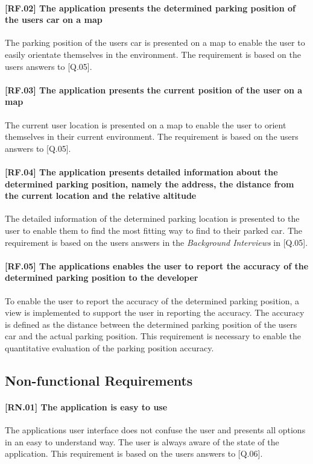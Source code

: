 \paragraph{[RF.02] The application presents the determined parking position of the users car on a map}
The parking position of the users car is presented on a map to enable the user to easily orientate themselves in the environment. The requirement is based on the users answers to [Q.05].

\paragraph{[RF.03] The application presents the current position of the user on a map}
The current user location is presented on a map to enable the user to orient themselves in their current environment. The requirement is based on the users answers to [Q.05].

\paragraph{[RF.04] The application presents detailed information about the determined parking position, namely the address, the distance from the current location and the relative altitude}
The detailed information of the determined parking location is presented to the user to enable them to find the most fitting way to find to their parked car. The requirement is based on the users answers in the \textit{Background Interviews} in [Q.05].

\paragraph{[RF.05] The applications enables the user to report the accuracy of the determined parking position to the developer}
To enable the user to report the accuracy of the determined parking position, a view is implemented to support the user in reporting the accuracy. The accuracy is defined as the distance between the determined parking position of the users car and the actual parking position. This requirement is necessary to enable the quantitative evaluation of the parking position accuracy. 

\subsection{Non-functional Requirements}

\paragraph{[RN.01] The application is easy to use}
The applications user interface does not confuse the user and presents all options in an easy to understand way. The user is always aware of the state of the application. This requirement is based on the users answers to [Q.06].

